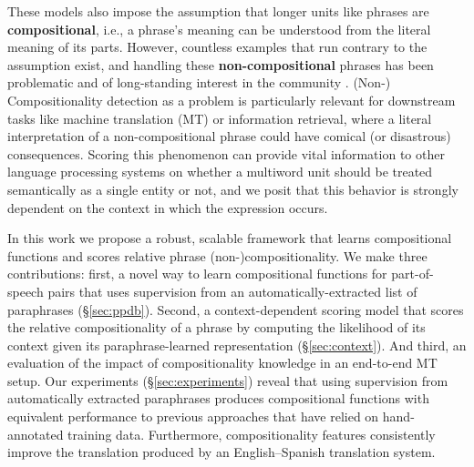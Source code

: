 \documentclass[11pt,letterpaper]{article}
\newcommand{\ensuretext}[1]{#1}
\newcommand{\clabcomment}[3]{\ensuretext{\textcolor{#3}{[#1 #2]}}}
\newcommand{\cjdmarker}{\ensuretext{\textcolor{green}{\ensuremath{^{\textsc{cj}}_{\textsc{d}}}}}}
\newcommand{\cjd}[1]{\clabcomment{\cjdmarker}{#1}{green}}
\begin{document}
These models also impose the assumption that longer units like phrases are \textbf{compositional}, i.e., a phrase's meaning can be understood from the literal meaning of its parts. 
However, countless examples that run contrary to the assumption exist, and handling these \textbf{non-compositional} phrases has been problematic and of long-standing interest in the community \cite{Lin1999,Sag2002}.
(Non-) Compositionality detection as a problem is particularly relevant for downstream tasks like machine translation (MT) or information retrieval, where a literal interpretation of a non-compositional phrase could have comical (or disastrous) consequences. 
Scoring this phenomenon can provide vital information to other language processing systems on whether a multiword unit should be treated semantically as a single entity or not, and we posit that this behavior is strongly dependent on the context in which the expression occurs. 


In this work we propose a robust, scalable framework that learns compositional functions and scores relative phrase (non-)compositionality.
We make three contributions: first, a novel way to learn compositional functions for part-of-speech pairs that uses supervision from an automatically-extracted list of paraphrases (\S\ref{sec:ppdb}). 
Second, a context-dependent scoring model that scores the relative compositionality of a phrase \cite{McCarthy2003} by computing the likelihood of its context given its paraphrase-learned representation (\S\ref{sec:context}). 
And third, an evaluation of the impact of compositionality knowledge in an end-to-end MT setup.
Our experiments (\S\ref{sec:experiments}) reveal that using supervision from automatically extracted paraphrases produces compositional functions with equivalent performance to previous approaches that have relied on hand-annotated training data. Furthermore, compositionality features consistently improve the translation produced by an English--Spanish translation system.
\end{document}
